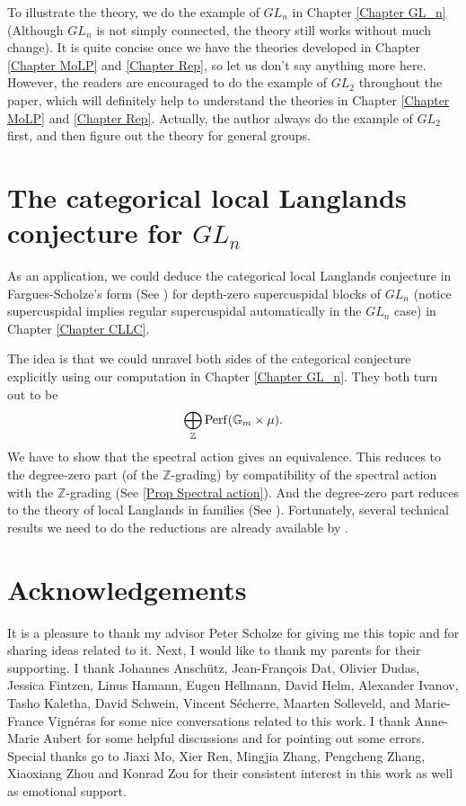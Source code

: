 To illustrate the theory, we do the example of $GL_n$ in Chapter \ref{Chapter GL_n} (Although $GL_n$ is not simply connected, the theory still works without much change). It is quite concise once we have the theories developed in Chapter \ref{Chapter MoLP} and \ref{Chapter Rep}, so let us don't say anything more here. However, the readers are encouraged to do the example of $GL_2$ throughout the paper, which will definitely help to understand the theories in Chapter \ref{Chapter MoLP} and \ref{Chapter Rep}. Actually, the author always do the example of $GL_2$ first, and then figure out the theory for general groups.

\section{The categorical local Langlands conjecture for $GL_n$}

As an application, we could deduce the categorical local Langlands conjecture in Fargues-Scholze's form (See \cite[Conjecture X.3.5]{fargues2021geometrization}) for depth-zero supercuspidal blocks of $GL_n$ (notice supercuspidal implies regular supercuspidal automatically in the $GL_n$ case) in Chapter \ref{Chapter CLLC}. 

The idea is that we could unravel both sides of the categorical conjecture explicitly using our computation in Chapter \ref{Chapter GL_n}. They both turn out to be
$$\bigoplus_{\mathbb{Z}}\operatorname{\operatorname{Perf}}(\mathbb{G}_m \times \mu).$$ 
We have to show that the spectral action gives an equivalence. This reduces to the degree-zero part (of the $\mathbb{Z}$-grading) by compatibility of the spectral action with the $\mathbb{Z}$-grading (See \ref{Prop Spectral action}). And the degree-zero part reduces to the theory of local Langlands in families (See \cite{helm2018converse}). Fortunately, several technical results we need to do the reductions are already available by \cite{zou2022categorical}.

\section{Acknowledgements}

It is a pleasure to thank my advisor Peter Scholze for giving me this topic and for sharing ideas related to it. Next, I would like to thank my parents for their supporting. I thank Johannes Anschütz, Jean-François Dat, Olivier Dudas, Jessica Fintzen, Linus Hamann, Eugen Hellmann, David Helm, Alexander Ivanov, Tasho Kaletha, David Schwein, Vincent Sécherre, Maarten Solleveld, and Marie-France Vignéras for some nice conversations related to this work. I thank Anne-Marie Aubert for some helpful discussions and for pointing out some errors. Special thanks go to Jiaxi Mo, Xier Ren, Mingjia Zhang, Pengcheng Zhang, Xiaoxiang Zhou and Konrad Zou for their consistent interest in this work as well as emotional support.
